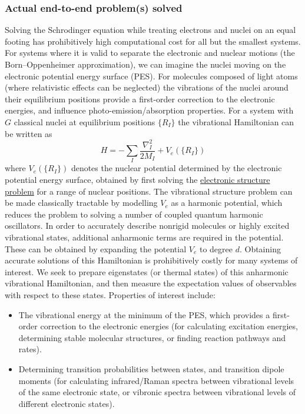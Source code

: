 \begin{refsection}
\subsubsection*{Actual end-to-end problem(s) solved}
Solving the Schrodinger equation while treating electrons and nuclei on an equal footing has prohibitively high computational cost for all but the smallest systems. For systems where it is valid to separate the electronic and nuclear motions (the Born--Oppenheimer approximation), we can imagine the nuclei moving on the electronic potential energy surface (PES). For molecules composed of light atoms (where relativistic effects can be neglected) the vibrations of the nuclei around their equilibrium positions provide a first-order correction to the electronic energies, and influence photo-emission/absorption properties. For a system with $G$ classical nuclei at equilibrium positions $\{R_I\}$ the vibrational Hamiltonian can be written as
\begin{equation}
    H = - \sum_I \frac{\nabla_I^2}{2 M_I} + V_e(\{ R_I \})
\end{equation}
where $V_e(\{ R_I \})$ denotes the nuclear potential determined by the electronic potential energy surface, obtained by first solving the \hyperref[appl:ElectronicStructure]{electronic structure problem} for a range of nuclear positions. The vibrational structure problem can be made classically tractable by modelling $V_e$ as a harmonic potential, which reduces the problem to solving a number of coupled quantum harmonic oscillators. In order to accurately describe nonrigid molecules or highly excited vibrational states, additional anharmonic terms are required in the potential. These can be obtained by expanding the potential $V_e$ to degree $d$. Obtaining accurate solutions of this Hamiltonian is prohibitively costly for many systems of interest. We seek to prepare eigenstates (or thermal states) of this anharmonic vibrational Hamiltonian, and then measure the expectation values of observables with respect to these states. Properties of interest include:
\begin{itemize}
    \item The vibrational energy at the minimum of the PES, which provides a first-order correction to the electronic energies (for calculating excitation energies, determining stable molecular structures, or finding reaction pathways and rates).
    \item Determining transition probabilities between states, and transition dipole moments (for calculating infrared/Raman spectra between vibrational levels of the same electronic state, or vibronic spectra between vibrational levels of different electronic states).

\end{itemize}
\end{refsection}
